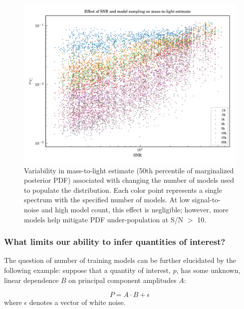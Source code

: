 \begin{figure}
    \centering
    \includegraphics{SNR_vs_modelnum}
    \caption[Number of models' effect on reliability of parameter estimate]{\fixspacing Variability in mass-to-light estimate (50th percentile of marginalized posterior PDF) associated with changing the number of models used to populate the distribution. Each color point represents a single spectrum with the specified number of models. At low signal-to-noise and high model count, this effect is negligible; however, more models help mitigate PDF under-population at S/N $>$ 10.}
    \label{fig:modelnumber_PDF}
\end{figure}

\subsubsection{What limits our ability to infer quantities of interest?}
\label{chap1:sec:nmodels_vs_accuracy}

The question of number of training models can be further elucidated by the following example: suppose that a quantity of interest, $p$, has some unknown, linear dependence $B$ on principal component amplitudes $A$:

\begin{equation}
    P = A \cdot B + \epsilon
\end{equation}
%
where $\epsilon$ denotes a vector of white noise.

